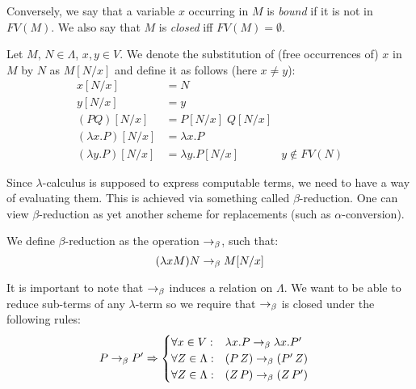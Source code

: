 Conversely, we say that a variable $x$ occurring in $M$ is \emph{bound} if it is
not in $FV(M)$. We also say that $M$ is \emph{closed} iff $FV(M) = \emptyset$.

\begin{definition}[Substitution]
    Let $M,\, N \in \Lambda$, $x, y\in V$. We denote the
    substitution of (free occurrences of) $x$ in $M$ by $N$ as $M[N/x]$ and
    define it as follows (here $x \neq y$):
    \begin{align*}
        x[N/x] &= N & \\
        y[N/x] &= y & \\
        (P Q)[N/x] &= P[N/x]\; Q[N/x] & \\
        (\lambda x. P)[N/x] &= \lambda x.P & \\
        (\lambda y. P)[N/x] &= \lambda y.P[N/x] & y \notin FV(N)
    \end{align*}
\end{definition}


Since $\lambda$-calculus is supposed to express computable terms, we need to
have a way of evaluating them. This is achieved via something called
$\beta$-reduction. One can view $\beta$-reduction as yet another scheme for
replacements (such as $\alpha$-conversion).

\begin{definition} We define $\beta$-reduction as the
operation $\rightarrow_\beta$, such that:
\[ (\lambda x M) N \rightarrow_\beta M[N/x] \]

It is important to note that $\rightarrow_\beta$ induces a relation on $\Lambda$. We
want to be able to reduce sub-terms of any $\lambda$-term so we require that
$\rightarrow_\beta$ is closed under the following rules:
\begin{align*}
    P \rightarrow_\beta P' &\Rightarrow
        \begin{cases}
            \forall x \in V: & \lambda x.P \rightarrow_\beta \lambda x. P' \\
            \forall Z \in \Lambda: & (P\, Z) \rightarrow_\beta (P'\, Z) \\
            \forall Z \in \Lambda: & (Z\, P) \rightarrow_\beta (Z\, P')
        \end{cases}
\end{align*}

\end{definition}

